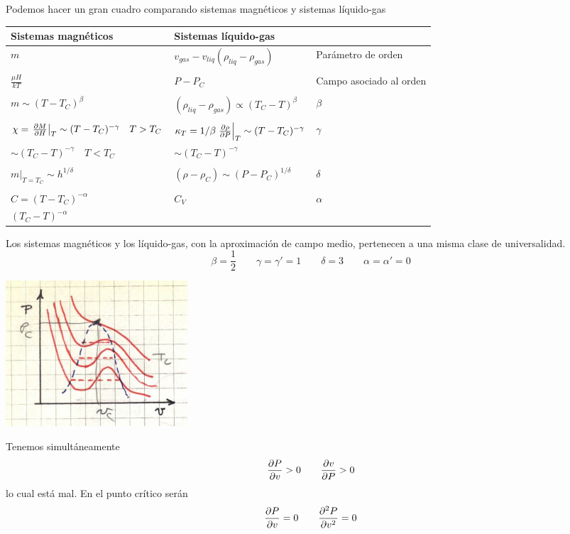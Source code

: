\documentclass[10pt,oneside]{CBFT_book}
\begin{document}
Podemos hacer un gran cuadro comparando sistemas magnéticos y sistemas líquido-gas

\begin{center}
\begin{tabular}{lll}
Sistemas magnéticos & Sistemas líquido-gas & \\
\hline
$m$ & $v_{gas} - v_{liq}( \rho_{liq} - \rho_{gas})$ & Parámetro de orden \\
 &  &  \\
$\displaystyle \frac{\mu H}{kT}$ & $P-P_C$ & Campo asociado al orden\\
 &  & \\
$ m \sim (T-T_C)^\beta $ & $( \rho_{liq} - \rho_{gas}) \propto (T_C-T)^\beta$ & $\beta$ \\
 &  &  \\
$\chi = \dpare{M}{H}{T} \sim (T-T_C)^{-\gamma} \quad T > T_C$ & 
$\kappa_T = 1/\beta \dpare{\rho}{P}{T} \sim (T-T_C)^{-\gamma}$ & $\gamma$\\
$\sim (T_C-T)^{-\gamma} \quad T < T_C$ & $\sim (T_C-T)^{-\gamma}$ & \\
 &  & \\
$\left.m\right|_{T=T_C} \sim h^{1/\delta}$ & $(\rho-\rho_C) \sim (P-P_C)^{1/\delta}$ & $\delta$\\
 &  & \\
$C = (T-T_C)^{-\alpha}$ & $C_V$ & $\alpha$\\
$(T_C-T)^{-\alpha}$ &  & 
\end{tabular}
\end{center}

Los sistemas magnéticos y los líquido-gas, con la aproximación de campo medio,
pertenecen a una misma clase de universalidad.
\[
	\beta=\frac{1}{2} \qquad 
	\gamma = \gamma' = 1 \qquad 
	\delta = 3 \qquad 
	\alpha = \alpha' = 0
\]


\includegraphics[scale=0.5]{images/1606337211.jpg}

Tenemos simultáneamente
\[
	\dpar{P}{v} > 0 \qquad \dpar{v}{P} > 0
\]
lo cual está mal. En el punto crítico serán
\[
	\dpar{P}{v} = 0 \qquad \dpar[2]{P}{v} = 0
\]
\end{document}

